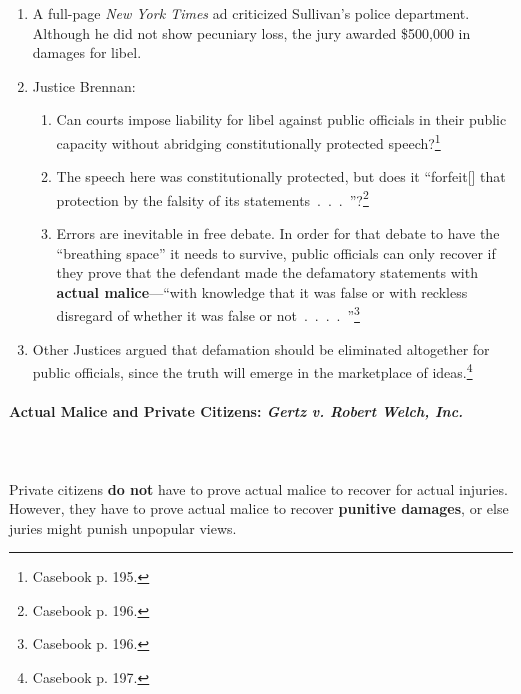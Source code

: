 \begin{enumerate}
    \item A full-page \emph{New York Times} ad criticized Sullivan's police 
    department. Although he did not show pecuniary loss, the jury awarded 
    \$500,000 in damages for libel.
    \item Justice Brennan:
    \begin{enumerate}
        \item Can courts impose liability for libel against public officials in 
        their public capacity without abridging constitutionally protected 
        speech?\footnote{Casebook p. 195.}
        \item The speech here was constitutionally protected, but does it 
        ``forfeit[] that protection by the falsity of its 
        statements~.~.~.~''?\footnote{Casebook p. 196.}
        \item Errors are inevitable in free debate. In order for that debate to 
        have the ``breathing space'' it needs to survive, public officials can 
        only recover if they prove that the defendant made the defamatory 
        statements with \textbf{actual malice}---``with knowledge that it was 
        false or with reckless disregard of whether it was false or 
        not~.~.~.~.~''\footnote{Casebook p. 196.}
    \end{enumerate}
    \item Other Justices argued that defamation should be eliminated altogether 
    for public officials, since the truth will emerge in the marketplace of 
    ideas.\footnote{Casebook p. 197.}
\end{enumerate}

\paragraph{Actual Malice and Private Citizens: \emph{Gertz v. Robert Welch, 
Inc.}}
~\\\\
Private citizens \textbf{do not} have to prove actual malice to recover for 
actual injuries. However, they have to prove actual malice to recover 
\textbf{punitive damages}, or else juries might punish unpopular views.

